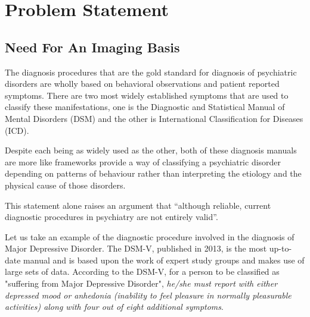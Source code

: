 \documentclass{article}
\begin{document}


\newpage

\section{Problem Statement}

\subsection{Need For An Imaging Basis}

The diagnosis procedures that are the gold standard for diagnosis of
psychiatric disorders are wholly based on behavioral observations and
patient reported symptoms. There are two most widely established
symptoms that are used to classify these manifestations, one is the
Diagnostic and Statistical Manual of Mental Disorders (DSM) and the
other is International Classification for Diseases (ICD).

Despite each being as widely used as the other, both of these
diagnosis manuals are more like frameworks provide a way of
classifying a psychiatric disorder depending on patterns of behaviour
rather than interpreting the etiology and the physical cause of those
disorders.

This statement alone raises an argument that ``although reliable,
current diagnostic procedures in psychiatry are not entirely valid''.

\iffalse
Reliable in the sense that any trained professional will arrive at
the same diagnosis for each patient.

Valid in the sense that it reflects the underlying psychological
and biological commonalities and differences among different
disorders to a certain extent. Validity continues to be more
difficult to achieve.
\fi

Let us take an example of the diagnostic procedure involved in the
diagnosis of Major Depressive Disorder. The DSM-V, published in 2013,
is the most up-to-date manual and is based upon the work of expert
study groups and makes use of large sets of data. According to the
DSM-V, for a person to be classified as "suffering from Major
Depressive Disorder", \textit{he/she must report with either depressed
mood or anhedonia (inability to feel pleasure in normally pleasurable
activities) along with four out of eight additional symptoms}.
\end{document}
